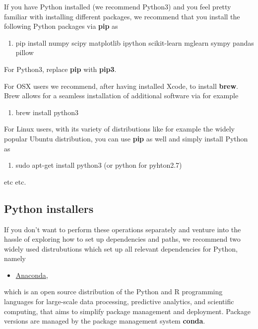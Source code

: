 \documentclass[%
oneside,                 %
final,                   %
10pt]{article}
\begin{document}
If you have Python installed (we recommend Python3) and you feel
pretty familiar with installing different packages, we recommend that
you install the following Python packages via \textbf{pip} as 

\begin{enumerate}
\item pip install numpy scipy matplotlib ipython scikit-learn mglearn sympy pandas pillow 
\end{enumerate}

\noindent
For Python3, replace \textbf{pip} with \textbf{pip3}.

For OSX users we recommend, after having installed Xcode, to
install \textbf{brew}. Brew allows for a seamless installation of additional
software via for example 

\begin{enumerate}
\item brew install python3
\end{enumerate}

\noindent
For Linux users, with its variety of distributions like for example the widely popular Ubuntu distribution,
you can use \textbf{pip} as well and simply install Python as 

\begin{enumerate}
\item sudo apt-get install python3  (or python for pyhton2.7)
\end{enumerate}

\noindent
etc etc. 



\subsection*{Python installers}

If you don't want to perform these operations separately and venture
into the hassle of exploring how to set up dependencies and paths, we
recommend two widely used distrubutions which set up all relevant
dependencies for Python, namely 

\begin{itemize}
\item \href{{https://docs.anaconda.com/}}{Anaconda}, 
\end{itemize}

\noindent
which is an open source
distribution of the Python and R programming languages for large-scale
data processing, predictive analytics, and scientific computing, that
aims to simplify package management and deployment. Package versions
are managed by the package management system \textbf{conda}. 
\end{document}
